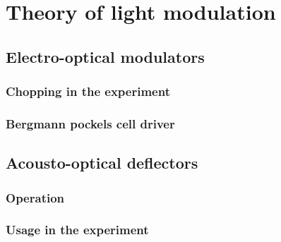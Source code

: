 \chapter{Theory of light modulation}
	\section{Electro-optical modulators}
		\subsection{Chopping in the experiment}
		\subsection{Bergmann pockels cell driver}

	\section{Acousto-optical deflectors}
		\subsection{Operation}
		\subsection{Usage in the experiment}

